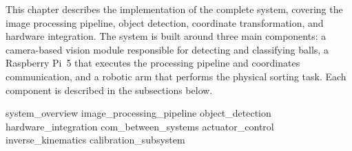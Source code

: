 
This chapter describes the implementation of the complete system, covering the image
processing pipeline, object detection, coordinate transformation, and hardware
integration. The system is built around three main components: a camera-based vision
module responsible for detecting and classifying balls, a Raspberry Pi~5 that
executes the processing pipeline and coordinates communication, and a robotic arm
that performs the physical sorting task. Each component is described in the
subsections below.

{system_overview}
{image_processing_pipeline}
{object_detection}
{hardware_integration}
{com_between_systems}
{actuator_control}
{inverse_kinematics}
{calibration_subsystem}